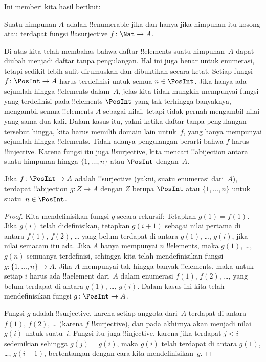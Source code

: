 \documentclass[../../../include/open-logic-section]{subfiles}
\begin{document}
Ini memberi kita hasil berikut:

\begin{cor}
Suatu himpunan $A$ adalah !!{enumerable} jika dan hanya jika himpunan itu kosong atau
terdapat fungsi !!a{surjective} $f\colon \Nat \to A$.
\end{cor}

Di atas kita telah membahas bahwa daftar !!{element}s suatu himpunan~$A$
dapat diubah menjadi daftar tanpa pengulangan. Hal ini juga benar untuk
enumerasi, tetapi sedikit lebih sulit dirumuskan dan dibuktikan secara ketat.
Setiap fungsi $f\colon \PosInt \to A$ harus terdefinisi untuk semua $n \in
\PosInt$. Jika hanya ada sejumlah hingga !!{element}s dalam~$A$, jelas kita
tidak mungkin mempunyai fungsi yang terdefinisi pada !!{element}s $\PosInt$
yang tak terhingga banyaknya, mengambil semua !!{element}s $A$ sebagai nilai,
tetapi tidak pernah mengambil nilai yang sama dua kali. Dalam kasus itu,
yakni ketika daftar tanpa pengulangan tersebut hingga, kita harus memilih
domain lain untuk~$f$, yang hanya mempunyai sejumlah hingga !!{element}s.
Tidak adanya pengulangan berarti bahwa $f$ harus !!{injective}. Karena fungsi itu
juga !!{surjective}, kita mencari !!a{bijection} antara suatu himpunan hingga
$\{1, \dots, n\}$ atau $\PosInt$ dengan~$A$.

\begin{prop}
Jika $f\colon \PosInt \to A$ adalah !!{surjective} (yakni, suatu enumerasi
dari~$A$), terdapat !!a{bijection} $g\colon Z \to A$ dengan $Z$ berupa
$\PosInt$ atau $\{1, \dots, n\}$ untuk suatu~$n \in \PosInt$.
\end{prop}

\begin{proof}
  Kita mendefinisikan fungsi $g$ secara rekursif: Tetapkan $g(1) = f(1)$. Jika
  $g(i)$ telah didefinisikan, tetapkan $g(i+1)$ sebagai nilai pertama di antara
  $f(1)$, $f(2)$, \dots{} yang belum terdapat di antara $g(1)$, \dots, $g(i)$,
  jika nilai semacam itu ada. Jika $A$ hanya mempunyai $n$ !!{element}s, maka
  $g(1)$, \dots, $g(n)$ semuanya terdefinisi, sehingga kita telah
  mendefinisikan fungsi $g\colon \{1, \dots, n\} \to A$. Jika $A$ mempunyai
  tak hingga banyak !!{element}s, maka untuk setiap $i$ harus ada !!a{element}
  dari~$A$ dalam enumerasi $f(1)$, $f(2)$, \dots, yang belum terdapat di antara
  $g(1)$, \dots, $g(i)$. Dalam kasus ini kita telah mendefinisikan fungsi
  $g\colon \PosInt \to A$.

  Fungsi $g$ adalah !!{surjective}, karena setiap anggota dari~$A$ terdapat di
  antara $f(1)$, $f(2)$, \dots{} (karena $f$ !!{surjective}), dan pada akhirnya
  akan menjadi nilai~$g(i)$ untuk suatu~$i$. Fungsi itu juga !!{injective},
  karena jika terdapat $j < i$ sedemikian sehingga $g(j) = g(i)$, maka $g(i)$
  telah terdapat di antara $g(1)$, \dots, $g(i-1)$, bertentangan dengan cara
  kita mendefinisikan~$g$.
\end{proof}
\end{document}
